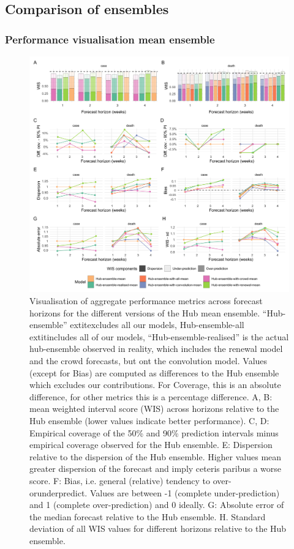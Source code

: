 \documentclass[10pt,letterpaper]{article}
\begin{document}
\newpage

\hypertarget{comparison-of-ensembles}{%
\subsection{Comparison of ensembles}\label{comparison-of-ensembles}}

\hypertarget{performance-visualisation-mean-ensemble}{%
\subsubsection{Performance visualisation mean
ensemble}\label{performance-visualisation-mean-ensemble}}

\begin{figure}[H]
\includegraphics[width=1\linewidth,]{../analysis/plots/aggregate-performance-rel-ensemble-mean-v4} \caption{Visualisation of aggregate performance metrics across forecast horizons for the different versions of the Hub mean ensemble. “Hub-ensemble”     extit{excludes} all our models, Hub-ensemble-all    extit{includes} all of our models, “Hub-ensemble-realised” is the actual hub-ensemble observed in reality, which includes the renewal model and the crowd forecasts, but ont the convolution model. Values (except for Bias) are computed as differences to the Hub ensemble which excludes our contributions. For Coverage, this is an absolute difference, for other metrics this is a percentage difference. A, B: mean weighted interval score (WIS) across horizons relative to the Hub ensemble (lower values indicate better performance). C, D: Empirical coverage of the 50\% and 90\% prediction intervals minus empirical coverage observed for the Hub ensemble. E: Dispersion relative to the dispersion of the Hub ensemble. Higher values mean greater dispersion of the forecast and imply ceteris paribus a worse score. F: Bias, i.e. general (relative) tendency to over- orunderpredict. Values are between -1 (complete under-prediction) and 1 (complete over-prediction) and 0 ideally. G: Absolute error of the median forecast relative to the Hub ensemble. H. Standard deviation of all WIS values for different horizons relative to the Hub ensemble.}\label{fig:agg-performance-ensemble-mean}

\end{figure}
\end{document}
